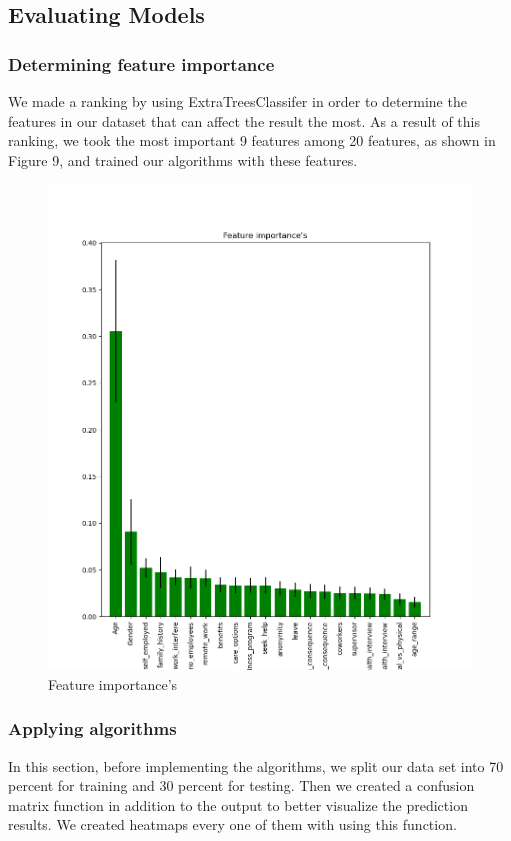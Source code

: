 \documentclass[onecolumn]{article}
\begin{document}
\subsection{Evaluating Models}
\subsubsection{Determining feature importance}
We made a ranking by using ExtraTreesClassifer in order to determine the features in our dataset that can affect the result the most. As a result of this ranking, we took the most important 9 features among 20 features, as shown in Figure 9, and trained our algorithms with these features.\bigbreak

\begin{figure}[h]
\centering
    \includegraphics[width=.82\linewidth]{fig/fig10.png}
\caption{\label{figure10}
Feature importance's}
\end{figure}


\subsubsection{Applying algorithms}
In this section, before implementing the algorithms, we split our data set into 70 percent for training and 30 percent for testing. Then we created a confusion matrix function in addition to the output to better visualize the prediction results. We created heatmaps every one of them with using this function.\bigbreak
\end{document}
